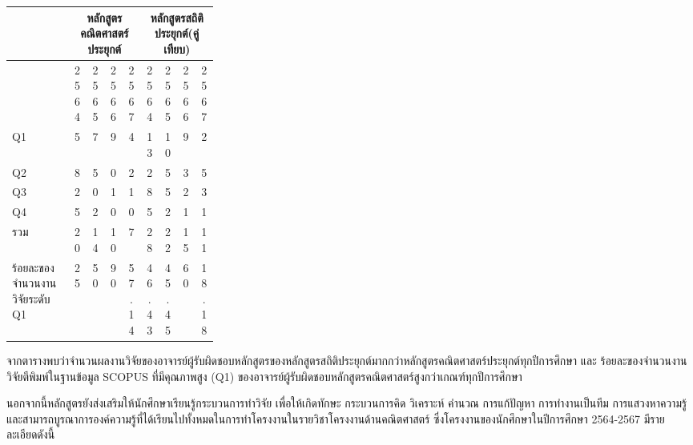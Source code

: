\begin{longtable}{|>{\centering\arraybackslash}p{0.3\linewidth}|*{8}{c|}} %
	\hline
	\multicolumn{1}{|>{\centering\arraybackslash}p{0.3\linewidth}|}{\textbf{ระดับผลงาน}} &
	\multicolumn{4}{c|}{\textbf{หลักสูตรคณิตศาสตร์ประยุกต์}} &
	\multicolumn{4}{c|}{\textbf{หลักสูตรสถิติประยุกต์(คู่เทียบ)}} \\
	\cline{2-9}
	\multicolumn{1}{|c|}{} &
	\multicolumn{1}{c|}{2564} &
	\multicolumn{1}{c|}{2565} &
	\multicolumn{1}{c|}{2566} &
	\multicolumn{1}{c|}{2567} &
	\multicolumn{1}{c|}{2564} &
	\multicolumn{1}{c|}{2565} &
	\multicolumn{1}{c|}{2566} &
	\multicolumn{1}{c|}{2567} \\
	\hline
	\endhead %
	
	\hline
	Q1  &   	5  &     7  &  	9  &  4   &   	13  &  	10 &    9 &  	2  \\
	\hline
	Q2 & 	8  &     5  &  	0  &   2  &   	2  &  5 &    3 &  	5  \\
	\hline
	Q3 & 	2   &     0  &  1  &  1   &   8  &  	5  &    2 &  	3  \\
	\hline
	Q4 & 	5  &     2  &  0  &   0  &   	5  &  	2  &    1 &  	1  \\
	\hline
	รวม & 	20  &     14  &  10  &  7   &   28	  &  	22  &    15 &  	11  \\
	\hline
	ร้อยละของจำนวนงานวิจัยระดับ Q1 & 	25   &     50 &  	90  &   57.14  &   46.43	  &  	45.45  &    60 &  	18.18  \\
	\hline
	
	
	
\end{longtable}


	

จากตารางพบว่าจำนวนผลงานวิจัยของอาจารย์ผู้รับผิดชอบหลักสูตรของหลักสูตรสถิติประยุกต์มากกว่าหลักสูตรคณิตศาสตร์ประยุกต์ทุกปีการศึกษา และ ร้อยละของจำนวนงานวิจัยตีพิมพ์ในฐานข้อมูล SCOPUS ที่มีคุณภาพสูง (Q1) ของอาจารย์ผู้รับผิดชอบหลักสูตรคณิตศาสตร์สูงกว่าเกณฑ์ทุกปีการศึกษา

นอกจากนี้หลักสูตรยังส่งเสริมให้นักศึกษาเรียนรู้กระบวนการทำวิจัย เพื่อให้เกิดทักษะ กระบวนการคิด วิเคราะห์ คำนวณ การแก้ปัญหา การทำงานเป็นทีม การแสวงหาความรู้ และสามารถบูรณาการองค์ความรู้ที่ได้เรียนไปทั้งหมดในการทำโครงงานในรายวิชาโครงงานด้านคณิตศาสตร์ ซึ่งโครงงานของนักศึกษาในปีการศึกษา 2564-2567 มีรายละเอียดดังนี้

